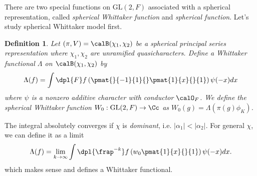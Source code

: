 \documentclass{article}
\newtheorem{definition}{Definition}[section]
\newcommand{\GL}{\mathrm{GL}}
\begin{document}
There are two special functions on $\GL(2, F)$ associated with a spherical representation, called \emph{spherical Whittaker function} and \emph{spherical function}. 
Let's study spherical Whittaker model first. 
\begin{definition}
Let $(\pi, V) = \calB(\chi_1, \chi_2)$ be a spherical principal series representation where $\chi_1, \chi_2$ are unramified quasicharacters. 
Define a Whittaker functional $\Lambda$ on $\calB(\chi_1, \chi_2)$ by 
$$
\Lambda(f) = \int\dpl{F} f\left( \pmat{}{-1}{1}{} \pmat{1}{x}{}{1}\right) \psi(-x) dx
$$
where $\psi$ is a nonzero additive character with conductor $\calO_F$. 
We define the spherical Whittaker function $W_{0}:\GL(2, F)\to \Cc$ as $W_{0}(g) = \Lambda(\pi(g)\phi_K)$. 
\end{definition}
The integral absolutely converges if $\chi$ is \emph{dominant}, i.e. $|\alpha_{1}| < |\alpha_{2}|$. 
For general $\chi$, we can define it as a limit
$$
\Lambda(f) = \lim_{k\to\infty} \int\dpl{\frap^{-k}} f\left( w_{0}\pmat{1}{x}{}{1}\right) \psi(-x)dx.
$$
which makes sense and defines a Whittaker functional. 
\end{document}
